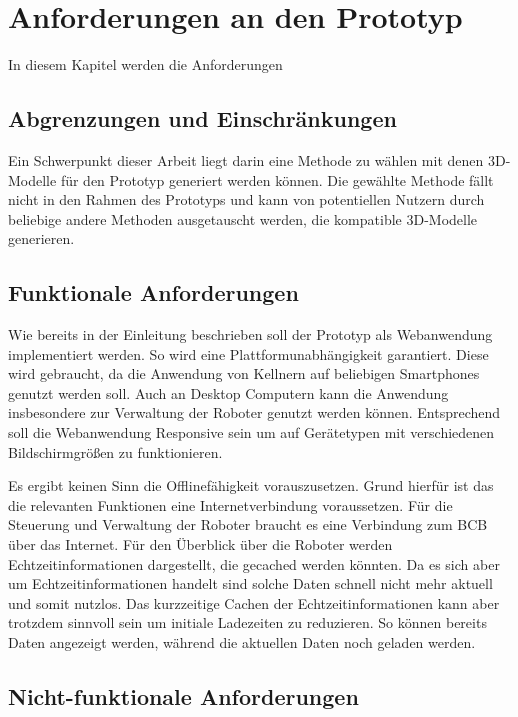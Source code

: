 \newpage
\section{Anforderungen an den Prototyp}
In diesem Kapitel werden die Anforderungen 

\subsection{Abgrenzungen und Einschränkungen}

Ein Schwerpunkt dieser Arbeit liegt darin eine Methode zu wählen mit denen 3D-Modelle für den Prototyp generiert werden können. Die gewählte Methode fällt nicht in den Rahmen des Prototyps und kann von potentiellen Nutzern durch beliebige andere Methoden ausgetauscht werden, die kompatible 3D-Modelle generieren.

\subsection{Funktionale Anforderungen}

Wie bereits in der Einleitung beschrieben soll der Prototyp als Webanwendung implementiert werden. So wird eine Plattformunabhängigkeit garantiert. Diese wird gebraucht, da die Anwendung von Kellnern auf beliebigen Smartphones genutzt werden soll. Auch an Desktop Computern kann die Anwendung insbesondere zur Verwaltung der Roboter genutzt werden können. Entsprechend soll die Webanwendung Responsive sein um auf Gerätetypen mit verschiedenen Bildschirmgrößen zu funktionieren. 



Es ergibt keinen Sinn die Offlinefähigkeit vorauszusetzen. Grund hierfür ist das die relevanten Funktionen eine Internetverbindung voraussetzen. Für die Steuerung und Verwaltung der Roboter braucht es eine Verbindung zum \ac{BCB} über das Internet. Für den Überblick über die Roboter werden Echtzeitinformationen dargestellt, die gecached werden könnten. Da es sich aber um Echtzeitinformationen handelt sind solche Daten schnell nicht mehr aktuell und somit nutzlos. Das kurzzeitige Cachen der Echtzeitinformationen kann aber trotzdem sinnvoll sein um initiale Ladezeiten zu reduzieren. So können bereits Daten angezeigt werden, während die aktuellen Daten noch geladen werden.

\subsection{Nicht-funktionale Anforderungen}

